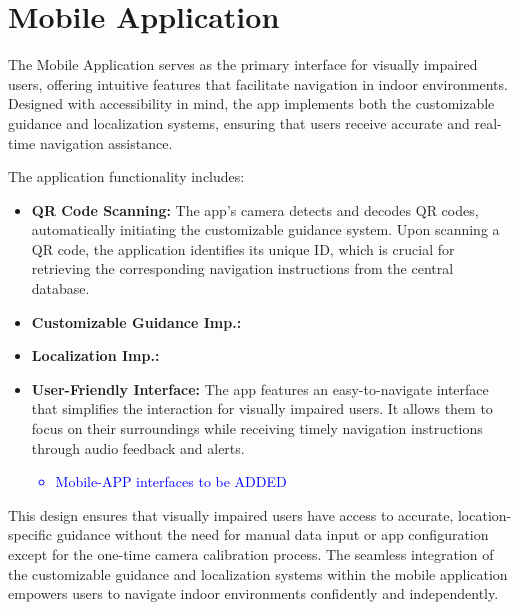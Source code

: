 \section{Mobile Application}

The Mobile Application serves as the primary interface for visually impaired users, offering intuitive features that facilitate navigation in indoor environments. Designed with accessibility in mind, the app implements both the customizable guidance and localization systems, ensuring that users receive accurate and real-time navigation assistance.

The application functionality includes:

\begin{itemize}
	\item \textbf{QR Code Scanning:} The app’s camera detects and decodes QR codes, automatically initiating the customizable guidance system. Upon scanning a QR code, the application identifies its unique ID, which is crucial for retrieving the corresponding navigation instructions from the central database.
	
	\item \textbf{Customizable Guidance Imp.:} 
	
	
	\item \textbf{Localization Imp.:} 
	
	\item \textbf{User-Friendly Interface:} The app features an easy-to-navigate interface that simplifies the interaction for visually impaired users. It allows them to focus on their surroundings while receiving timely navigation instructions through audio feedback and alerts.
	
	\textcolor{blue}{
		\begin{itemize}
			\item Mobile-APP interfaces to be ADDED
		\end{itemize}}
	
	
\end{itemize}

This design ensures that visually impaired users have access to accurate, location-specific guidance without the need for manual data input or app configuration except for the one-time camera calibration process. The seamless integration of the customizable guidance and localization systems within the mobile application empowers users to navigate indoor environments confidently and independently.
